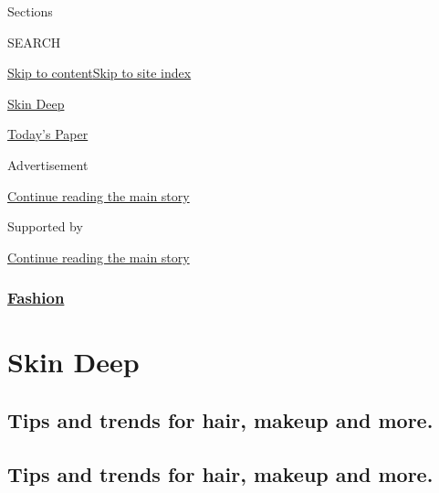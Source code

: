 Sections

SEARCH

\protect\hyperlink{site-content}{Skip to
content}\protect\hyperlink{site-index}{Skip to site index}

\href{https://www.nytimes.com/column/skin-deep}{Skin Deep}

\href{https://myaccount.nytimes.com/auth/login?response_type=cookie\&client_id=vi}{}

\href{https://www.nytimes.com/section/todayspaper}{Today's Paper}

Advertisement

\protect\hyperlink{after-top}{Continue reading the main story}

Supported by

\protect\hyperlink{after-sponsor}{Continue reading the main story}

\hypertarget{fashion}{%
\subsubsection{\texorpdfstring{\href{/section/fashion}{Fashion}}{Fashion}}\label{fashion}}

\hypertarget{skin-deep}{%
\section{Skin Deep}\label{skin-deep}}

\hypertarget{tips-and-trends-for-hair-makeup-and-more}{%
\subsection{Tips and trends for hair, makeup and
more.}\label{tips-and-trends-for-hair-makeup-and-more}}

\hypertarget{tips-and-trends-for-hair-makeup-and-more-1}{%
\subsection{Tips and trends for hair, makeup and
more.}\label{tips-and-trends-for-hair-makeup-and-more-1}}

